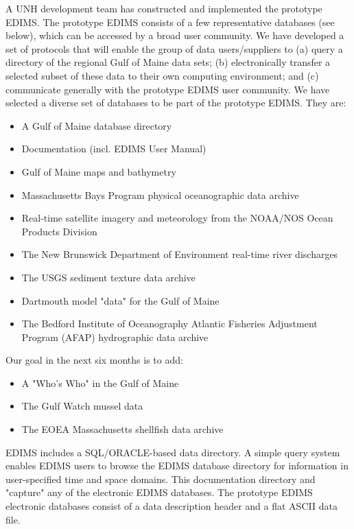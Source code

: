 \bigskip
{}

	A UNH development team has constructed and implemented the 
prototype EDIMS.  The prototype EDIMS consists of a few representative 
databases (see below), which can be accessed by a broad user community.  
We have developed a set of protocols that will enable the group of data 
users/suppliers to (a) query a directory of the regional Gulf of Maine data 
sets; (b) electronically transfer a selected subset of these data to their 
own computing environment; and (c) communicate generally with the 
prototype EDIMS user community.  We have selected a diverse set of 
databases to be part of the prototype EDIMS.  They are:

\begin{itemize}
\item    A Gulf of Maine database directory
\item   Documentation (incl. EDIMS User Manual)
\item   Gulf of Maine maps and bathymetry
\item   Massachusetts Bays Program physical oceanographic data archive
\item   Real-time satellite imagery and meteorology from the NOAA/NOS 
		Ocean Products Division
\item   The New Brunswick Department of Environment real-time river 
		discharges
\item   The USGS sediment texture data archive
\item   Dartmouth model "data" for the Gulf of Maine
\item   The Bedford Institute of Oceanography Atlantic Fisheries 	
		Adjustment Program (AFAP) hydrographic data archive
\end{itemize}
\smallskip
	Our goal in the next six months is to add:
\smallskip
\begin{itemize}
\item   A "Who's Who" in the Gulf of Maine
\item   The Gulf Watch mussel data
\item   The EOEA Massachusetts shellfish data archive
\end{itemize}
\smallskip

	EDIMS includes a SQL/ORACLE-based data directory.  A simple query 
system enables EDIMS users to browse the EDIMS database directory for 
information in user-specified time and space domains.  This 
documentation  directory and "capture" any of the electronic EDIMS 
databases.  The prototype EDIMS electronic databases consist of a data 
description header and a flat ASCII data file.

